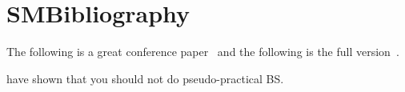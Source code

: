 \documentclass[class=scrartcl,crop=false]{standalone}
\begin{document}
\section{SMBibliography}

The following is a great conference paper~\cite{HolikMM16} and the following is the full version~\cite{HolikMM16a}.

 have shown that you should not do pseudo-practical BS.

\printbibliography
\end{document}
